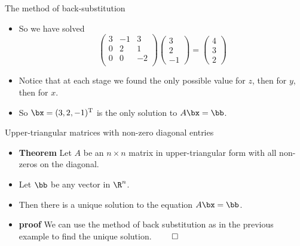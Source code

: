 \documentclass{beamer}
\begin{document}
\begin{frame}{The method of back-substitution}

\begin{itemize}
\item So we have solved
$$
\begin{pmatrix}
3 & -1  & 3 \\
0 & 2  & 1 \\
0 & 0 & -2 \\
\end{pmatrix}
\begin{pmatrix}
3 \\ 2 \\ -1
\end{pmatrix}
=
\begin{pmatrix}
4 \\ 3 \\ 2
\end{pmatrix}
$$
\item Notice that at each stage we found the only possible value for $z$,
then for $y$, then for $x$.
\item So $\bx=(3,2,-1)^{\text{T}}$ is the only solution to $A\bx=\bb$.
\end{itemize}


\end{frame}

\begin{frame}{Upper-triangular matrices with non-zero diagonal entries}

\begin{itemize}
\item \textbf{Theorem} Let $A$ be an $n\times n$ matrix in upper-triangular
form with all non-zeros on the diagonal.
\item Let $\bb$ be any vector in $\R^n$.
\item Then there is a unique solution to the equation $A\bx=\bb$.
\item \textbf{proof} We can use the method of back substitution as in the
previous example to find the unique solution. $\qed$
\end{itemize}

\end{frame}
\end{document}
